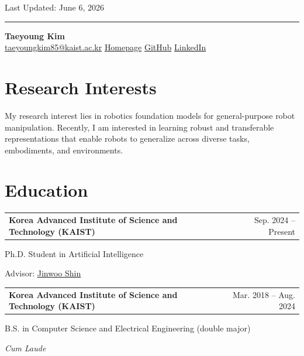 \documentclass[11pt,a4paper]{article}
\makeatletter
\newcommand{\entry}[2]{%
  \noindent\begin{tabularx}{\linewidth}{@{}X@{}r@{}}
    \textbf{#1} & {\small #2}
  \end{tabularx}\par}
\newcommand{\subentry}[1]{\noindent #1\par}
\makeatother
\begin{document}
{\small\hfill Last Updated: June 6, 2026}\par
\vspace{2pt}
\hrule
\vspace{10pt}

\begin{center}
  {\LARGE\bfseries Taeyoung Kim}\\[8pt]
  {\small
    \href{mailto:taeyoungkim85@kaist.ac.kr}{taeyoungkim85@kaist.ac.kr} \;\textbar\;
    \href{https://ismty0805.github.io}{Homepage} \;\textbar\;
    \href{https://github.com/ismty0805}{GitHub} \;\textbar\;
    \href{https://www.linkedin.com/in/taeyoung-kim85/}{LinkedIn}
  }
\end{center}

\section{Research Interests}
My research interest lies in robotics foundation models for general-purpose
robot manipulation. Recently, I am interested in learning robust and
transferable representations that enable robots to generalize across diverse
tasks, embodiments, and environments.

\section{Education}
\entry{Korea Advanced Institute of Science and Technology (KAIST)}{Sep. 2024 -- Present}
\subentry{Ph.D. Student in Artificial Intelligence}
\subentry{Advisor: \href{https://alinlab.kaist.ac.kr/shin.html}{Jinwoo Shin}}
\vspace{6pt}

\entry{Korea Advanced Institute of Science and Technology (KAIST)}{Mar. 2018 -- Aug. 2024}
\subentry{B.S. in Computer Science and Electrical Engineering (double major)}
\subentry{\textit{Cum Laude}}

\end{document}
